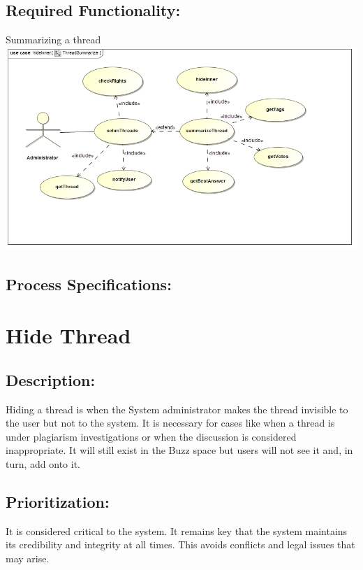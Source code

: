 \documentclass[a4paper,11pt]{article}
\begin{document}
\subsection{Required Functionality:} 
Summarizing a thread\\
\includegraphics[width=1\linewidth]{./Images/SCHMThread/ThreadSummarize.jpg}\\
\subsection{Process Specifications:} 

\section{Hide Thread}
\subsection*{Description:}
Hiding a thread is when the System administrator makes the thread invisible to the user but not to the system. It is necessary for cases like when a thread is under plagiarism investigations or when the discussion is considered inappropriate. It will still exist in the Buzz space but users will not see it and, in turn, add onto it. \\
\subsection{Prioritization:}
It is considered critical to the system. It remains key that the system maintains its credibility and integrity at all times. This avoids conflicts and legal issues that may arise.\\ 
\end{document}
